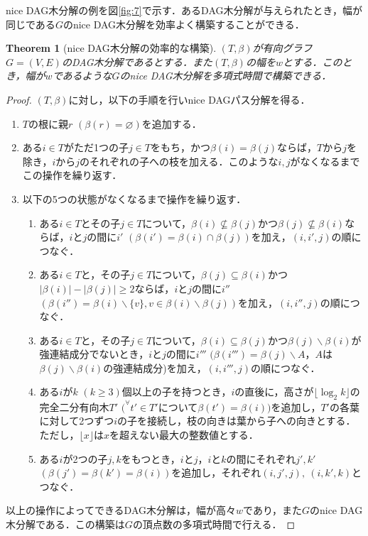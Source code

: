 \documentclass[master]{kuisthesis}		%
\theoremstyle{plain}
\newtheorem{theorem}{Theorem}
\theoremstyle{definition}
\begin{document}
nice DAG木分解の例を図\ref{fig:7}で示す．あるDAG木分解が与えられたとき，幅が同じである$G$のnice DAG木分解を効率よく構築することができる．

\begin{theorem}[nice DAG木分解の効率的な構築]
    $(T, \beta)$が有向グラフ$G=(V, E)$のDAG木分解であるとする．また$(T, \beta)$の幅を$w$とする．このとき，幅が$w$であるような$G$のnice DAG木分解を多項式時間で構築できる．
\end{theorem}

\begin{proof}
    $(T, \beta)$に対し，以下の手順を行いnice DAGパス分解を得る．

    \begin{enumerate}
        \item $T$の根に親$r$ $(\beta(r) = \varnothing)$を追加する．
        \item ある$i \in T$がただ1つの子$j \in T$をもち，かつ$\beta(i) = \beta(j)$ならば，$T$から$j$を除き，$i$から$j$のそれぞれの子への枝を加える．このような$i, j$がなくなるまでこの操作を繰り返す．
        \item 以下の5つの状態がなくなるまで操作を繰り返す．
        \begin{enumerate}
            \item ある$i \in T$とその子$j \in T$について，$\beta(i) \nsubseteq \beta(j)$かつ$\beta(j) \nsubseteq \beta(i)$ならば，$i$と$j$の間に$i'$ $(\beta(i') = \beta(i) \cap \beta(j))$を加え，$(i, i', j)$の順につなぐ．
            \item ある$i \in T$と，その子$j \in T$について，$\beta(j) \subseteq \beta(i)$かつ$|\beta(i)| - |\beta(j)| \geq 2$ならば，$i$と$j$の間に$i''$ $(\beta(i'') = \beta(i) \backslash \{v\}, v \in \beta(i) \backslash \beta(j))$を加え，$(i, i'', j)$の順につなぐ．
            \item ある$i \in T$と，その子$j \in T$について，$\beta(i) \subseteq \beta(j)$かつ$\beta(j) \backslash \beta(i)$が強連結成分でないとき，$i$と$j$の間に$i'''$ $(\beta(i''') = \beta(j) \backslash A$，$A$は$\beta(j) \backslash \beta(i)$の強連結成分)を加え，$(i, i''', j)$の順につなぐ．
            \item ある$i$が$k$ $(k \geq 3)$個以上の子を持つとき，$i$の直後に，高さが$\lfloor \log_{2} k \rfloor$の完全二分有向木$T'$ $(^{\forall}t' \in T'$について$\beta(t') = \beta(i))$を追加し，$T'$の各葉に対して2つずつ$i$の子を接続し，枝の向きは葉から子への向きとする．ただし，$\lfloor x \rfloor$は$x$を超えない最大の整数値とする．
            \item ある$i$が2つの子$j, k$をもつとき，$i$と$j$，$i$と$k$の間にそれぞれ$j', k'$ $(\beta(j') = \beta(k') = \beta(i))$を追加し，それぞれ$(i, j', j),\ (i, k', k)$とつなぐ．
        \end{enumerate}
    \end{enumerate}

    以上の操作によってできるDAG木分解は，幅が高々$w$であり，また$G$のnice DAG木分解である．この構築は$G$の頂点数の多項式時間で行える．
\end{proof}
\end{document}
